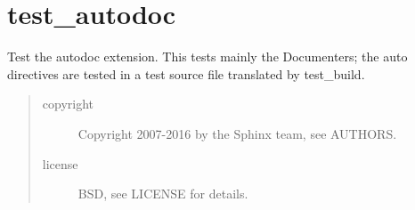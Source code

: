 \documentclass[letterpaper,10pt,english]{sphinxmanual}
\begin{document}
\section{test\_autodoc}
\label{autodoc:test-autodoc}
Test the autodoc extension.  This tests mainly the Documenters; the auto
directives are tested in a test source file translated by test\_build.
\begin{quote}\begin{description}
\item[{copyright}] \leavevmode
Copyright 2007-2016 by the Sphinx team, see AUTHORS.

\item[{license}] \leavevmode
BSD, see LICENSE for details.

\end{description}\end{quote}
\end{document}
